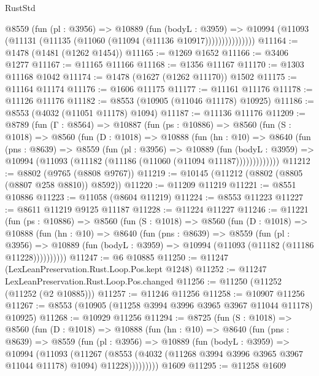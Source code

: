 \begin{lexlean}{RustStd}
\begin{coremodule}
                @8559
                  (fun (pl : @3956) =>
                  @10889
                    (fun (bodyL : @3959) =>
                    @10994 (@11093 (@11131 (@11135 (@11060 (@11094 (@11136 @10917)))))))))))))))
@11164 := @1478 (@1481 (@1262 @1454))
@11165 := @1269 @1652
@11166 := @3406 @1277
@11167 := @11165 @11166
@11168 := @1356 @11167
@11170 := @1303 @11168 @1042
@11174 := @1478 (@1627 (@1262 @11170)) @1502
@11175 := @11164 @11174
@11176 := @1606 @11175
@11177 := @11161 @11176
@11178 := @11126 @11176
@11182 := @8553 (@10905 (@11046 @11178) @10925)
@11186 := @8553 (@4032 (@11051 @11178) @1094)
@11187 := @11136 @11176
@11209 := @8789
    (fun (Γ : @8564) =>
    @10887
      (fun (ps : @10886) =>
      @8560
        (fun (S : @1018) =>
        @8560
          (fun (D : @1018) =>
          @10888
            (fun (hn : @10) =>
            @8640
              (fun (pns : @8639) =>
              @8559
                (fun (pl : @3956) =>
                @10889
                  (fun (bodyL : @3959) =>
                  @10994 (@11093 (@11182 (@11186 (@11060 (@11094 @11187)))))))))))))
@11212 := @8802 (@9765 (@8808 @9767))
@11219 := @10145 (@11212 (@8802 (@8805 (@8807 @258 @8810)) @8592))
@11220 := @11209 @11219
@11221 := @8551 @10886
@11223 := @11058 (@8604 @11219)
@11224 := @8553 @11223
@11227 := @8611 @11219 @9125 @11187
@11228 := @11224 @11227
@11246 := @11221
    (fun (ps : @10886) =>
    @8560
      (fun (S : @1018) =>
      @8560
        (fun (D : @1018) =>
        @10888
          (fun (hn : @10) =>
          @8640
            (fun (pns : @8639) =>
            @8559
              (fun (pl : @3956) =>
              @10889 (fun (bodyL : @3959) => @10994 (@11093 (@11182 (@11186 @11228))))))))))
@11247 := @6 @10885
@11250 := @11247 (LexLeanPreservation.Rust.Loop.Pos.kept @1248)
@11252 := @11247 LexLeanPreservation.Rust.Loop.Pos.changed
@11256 := @11250 (@11252 (@11252 (@2 @10885)))
@11257 := @11246 @11256
@11258 := @10907 @11256
@11267 := @8553 (@10905 (@11258 @3994 @3996 @3965 @3967 @11044 @11178) @10925)
@11268 := @10929 @11256
@11294 := @8725
    (fun (S : @1018) =>
    @8560
      (fun (D : @1018) =>
      @10888
        (fun (hn : @10) =>
        @8640
          (fun (pns : @8639) =>
          @8559
            (fun (pl : @3956) =>
            @10889
              (fun (bodyL : @3959) =>
              @10994
                (@11093
                  (@11267
                    (@8553
                      (@4032 (@11268 @3994 @3996 @3965 @3967 @11044 @11178) @1094)
                      @11228)))))))))
    @1609
@11295 := @11258 @1609

\end{coremodule}
\end{lexlean}
